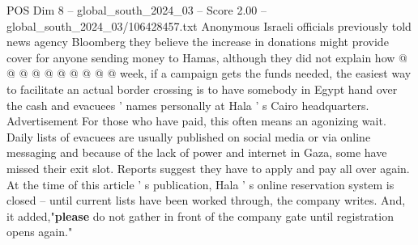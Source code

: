 \begin{textsample}{POS Dim 8 – global\_south\_2024\_03 – Score 2.00 – global\_south\_2024\_03/106428457.txt}
Anonymous Israeli officials previously told news agency Bloomberg they believe the increase in donations might provide cover for anyone sending money to Hamas, although they did not explain how @ @ @ @ @ @ @ @ @ @ week, if a campaign gets the funds needed, the easiest way to facilitate an actual border crossing is to have somebody in Egypt hand over the cash and evacuees ' names personally at Hala ' s Cairo headquarters.
Advertisement For those who have paid, this often means an agonizing wait.
Daily lists of evacuees are usually published on social media or via online messaging and because of the lack of power and internet in Gaza, some have missed their exit slot.
Reports suggest they have to apply and pay all over again.
At the time of this article ' s publication, Hala ' s online reservation system is closed -- until current lists have been worked through, the company writes.
And, it added,"\textbf{please} do not gather in front of the company gate until registration opens again."

\end{textsample}
